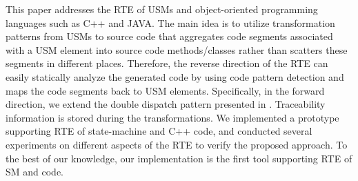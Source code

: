 
This paper addresses the RTE of USMs and object-oriented programming languages such as C++ and JAVA. The main idea is to utilize transformation patterns from USMs to source code that aggregates code segments associated with a USM element into source code methods/classes rather than scatters these segments in different places. Therefore, the reverse direction of the RTE can easily statically analyze the generated code by using code pattern detection and maps the code segments back to USM elements. Specifically, in the forward direction, we extend the double dispatch pattern presented in \cite{spinke_object-oriented_2013}. Traceability information is stored during the transformations. We implemented a prototype supporting RTE of state-machine and C++ code, and conducted several experiments on different aspects of the RTE to verify the proposed approach. To the best of our knowledge, our implementation is the first tool supporting RTE of SM and code. 


